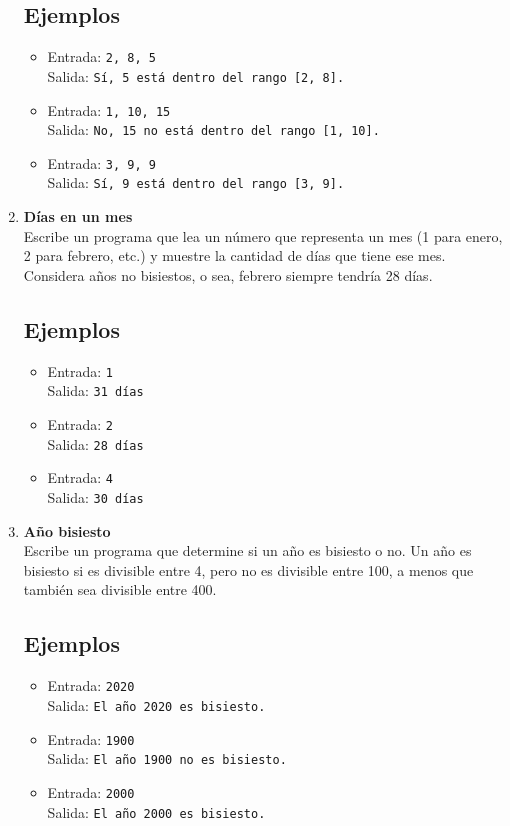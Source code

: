 \begin{enumerate}
    \subsection*{Ejemplos}
    \begin{itemize}
        \item Entrada: \texttt{2, 8, 5}\\
              Salida: \texttt{Sí, 5 está dentro del rango [2, 8].}
        \item Entrada: \texttt{1, 10, 15}\\
              Salida: \texttt{No, 15 no está dentro del rango [1, 10].}
        \item Entrada: \texttt{3, 9, 9}\\
              Salida: \texttt{Sí, 9 está dentro del rango [3, 9].}
    \end{itemize}

    \item \textbf{Días en un mes}\\
    Escribe un programa que lea un número que representa un mes (1 para enero, 2 para febrero, etc.) y muestre la cantidad de días que tiene ese mes. Considera años no bisiestos, o sea, febrero siempre tendría 28 días.
    \subsection*{Ejemplos}
    \begin{itemize}
        \item Entrada: \texttt{1}\\
              Salida: \texttt{31 días}
        \item Entrada: \texttt{2}\\
              Salida: \texttt{28 días}
        \item Entrada: \texttt{4}\\
              Salida: \texttt{30 días}
    \end{itemize}

    \item \textbf{Año bisiesto}\\
    Escribe un programa que determine si un año es bisiesto o no. Un año es bisiesto si es divisible entre 4, pero no es divisible entre 100, a menos que también sea divisible entre 400.
    \subsection*{Ejemplos}
    \begin{itemize}
        \item Entrada: \texttt{2020}\\
              Salida: \texttt{El año 2020 es bisiesto.}
        \item Entrada: \texttt{1900}\\
              Salida: \texttt{El año 1900 no es bisiesto.}
        \item Entrada: \texttt{2000}\\
              Salida: \texttt{El año 2000 es bisiesto.}
    \end{itemize}


\end{enumerate}
